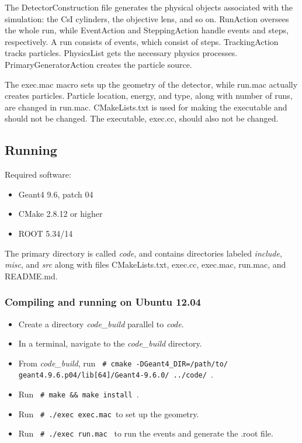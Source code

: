 \documentclass[a4paper,10pt]{article}
\begin{document}
The DetectorConstruction file generates the physical objects associated with the simulation: the CsI cylinders, the objective lens, and so on. RunAction oversees the whole run, while EventAction and SteppingAction handle events and steps, respectively. A run consists of events, which consist of steps. TrackingAction tracks particles. PhysicsList gets the necessary physics processes. PrimaryGeneratorAction creates the particle source. 

The exec.mac macro sets up the geometry of the detector, while run.mac actually creates particles. Particle location, energy, and type, along with number of runs, are changed in run.mac. CMakeLists.txt is used for making the executable and should not be changed. The executable, exec.cc, should also not be changed. 

\subsection{Running}

Required software: 

\begin{itemize}
	\item Geant4 9.6, patch 04
	\item CMake 2.8.12 or higher
	\item ROOT 5.34/14
\end{itemize}

The primary directory is called \textit{code}, and contains directories labeled \textit{include}, \textit{misc}, and \textit{src} along with files CMakeLists.txt, exec.cc, exec.mac, run.mac, and README.md.

\subsubsection{Compiling and running on Ubuntu 12.04} 

\begin{itemize}
	\item Create a directory \textit{code\_build} parallel to \textit{code}.
	\item In a terminal, navigate to the \textit{code\_build} directory. 
	\item From \textit{code\_build}, run \texttt{ \# cmake -DGeant4\_DIR=/path/to/\\geant4.9.6.p04/lib[64]/Geant4-9.6.0/ ../code/ }.
	\item Run \texttt{ \# make \&\& make install }.
	\item Run \texttt{ \# ./exec exec.mac }to set up the geometry.
	\item Run \texttt{ \# ./exec run.mac } to run the events and generate the .root file.
\end{itemize}
\end{document}
